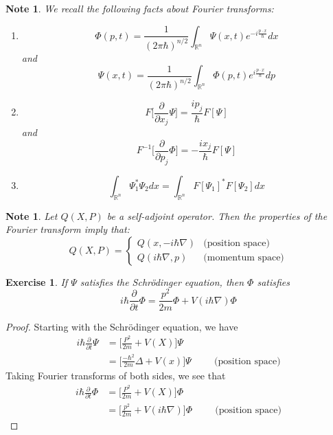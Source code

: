 \documentclass[12pt]{amsart}
\newtheorem{note}[thm]{Note}
\newtheorem{ex}[thm]{Exercise}
\newcommand{\Del}{\Delta}
\newcommand{\R}{\mathbb{R}}
\newcommand{\p}[1]{\frac{\partial}{\partial{#1}}}
\begin{document}
\begin{note}
	We recall the following facts about Fourier transforms:
	\begin{enumerate}
		\item $$\Phi(p,t) = \frac{1}{(2 \pi \hbar)^{n/2}} \int_{\R ^n}\Psi(x,t)e^{-i \frac{p \cdot x}{\hbar} }dx $$ and $$\Psi(x,t) = \frac{1}{(2 \pi \hbar)^{n/2}} \int_{\R ^n}\Phi(p,t)e^{i \frac{p \cdot x}{\hbar} }dp $$
		
		\item $$F\bigg[\p{x_j} \Psi \bigg] = \frac{i p_j}{\hbar}F[\Psi]$$
		and $$F^{-1}\bigg[\p{p_j} \Phi \bigg] = -\frac{i x_j}{\hbar}F[\Psi]$$
		
		\item $$\int_{\R^n} \Psi_1^* \Psi_2 dx = \int_{\R^n} F[\Psi_1]^* F[\Psi_2]dx$$
	\end{enumerate}
\end{note}

\begin{note}
	Let $Q(X,P)$ be a self-adjoint operator. Then the properties of the Fourier transform imply that:
	\[
	Q(X,P)=
	\begin{cases}
		Q(x, -i\hbar \nabla) & \text{(position space)}\\
		Q(i\hbar \nabla, p) & \text{(momentum space)}
	\end{cases}
	\]
\end{note}

\begin{ex}
	If $\Psi$ satisfies the Schr\"{o}dinger equation, then $\Phi$ satisfies $$i\hbar \p{t}\Phi = \frac{p^2}{2m}\Phi + V(i \hbar \nabla)\Phi$$
\end{ex}

\begin{proof}
	Starting with the Schr\"{o}dinger equation, we have 
	\begin{align*}
		i\hbar \p{t} \Psi 
		&= \bigg[\frac{P^2}{2m} + V(X)\bigg] \Psi\\
		&= \bigg[\frac{-\hbar^2}{2m}\Del + V(x)\bigg] \Psi \hspace{1cm} \text{(position space)}
	\end{align*} 
	Taking Fourier transforms of both sides, we see that 
	\begin{align*}
		i\hbar \p{t} \Phi 
		&= \bigg[\frac{P^2}{2m} + V(X)\bigg] \Phi\\
		&= \bigg[\frac{p^2}{2m} + V(i \hbar \nabla)\bigg] \Phi \hspace{1cm} \text{(position space)}
	\end{align*} 
\end{proof}
\end{document}
